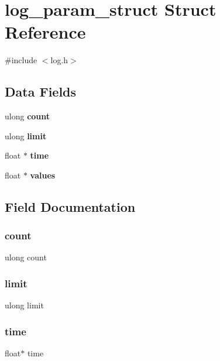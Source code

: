 \section{log\+\_\+param\+\_\+struct Struct Reference}
\label{structlog__param__struct}


{\ttfamily \#include $<$log.\+h$>$}

\subsection*{Data Fields}
\begin{DoxyCompactItemize}
\item 
ulong \textbf{ count}
\item 
ulong \textbf{ limit}
\item 
float $\ast$ \textbf{ time}
\item 
float $\ast$ \textbf{ values}
\end{DoxyCompactItemize}


\subsection{Field Documentation}
\mbox{\label{structlog__param__struct_aec2cfcb08132e96314e07b96dcda60fe}} 
\subsubsection{count}
{\footnotesize\ttfamily ulong count}

\mbox{\label{structlog__param__struct_a1aafeaebc23c5017e813ab4816d159e8}} 
\subsubsection{limit}
{\footnotesize\ttfamily ulong limit}

\mbox{\label{structlog__param__struct_a928d882ee5cf3b24e7acb47d57f089e7}} 
\subsubsection{time}
{\footnotesize\ttfamily float$\ast$ time}

